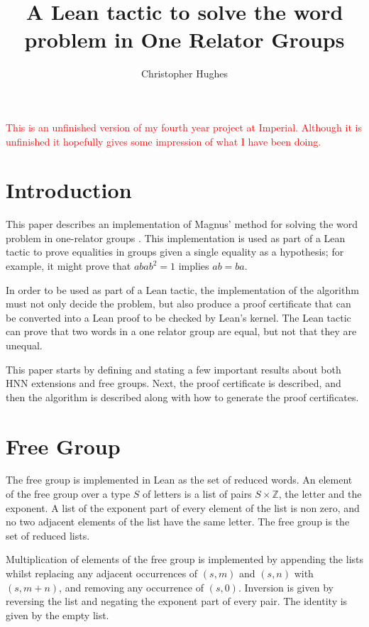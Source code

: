 \documentclass[11pt]{article} %
\title{A Lean tactic to solve the word problem in One Relator Groups}
\author{Christopher Hughes}
\theoremstyle{definition}
\theoremstyle{definition}
\theoremstyle{definition}
\theoremstyle{definition}
\theoremstyle{definition}
\theoremstyle{definition}
\begin{document}
\maketitle

\textcolor{red}{This is an unfinished version of my fourth year project at Imperial.
Although it is unfinished it hopefully gives some impression of what I have been doing.}


\section{Introduction}
This paper describes an implementation of Magnus' method for solving the
word problem in one-relator groups \cite{mccool_schupp_1973}\cite{PutmanOneRelator}.
This implementation is used as part of a Lean tactic to prove equalities in groups given a single equality as a hypothesis; for example, it might prove that $abab^2 = 1$ implies $ab = ba$.

In order to be used as part of a Lean tactic, the implementation of the
algorithm must not only decide the problem, but also produce a proof certificate
that can be converted into a Lean proof to be checked by Lean's kernel. The Lean
tactic can prove that two words in a one relator group are equal, but not that they are unequal.

This paper starts by defining and stating a few important results about both
HNN extensions and free groups. Next, the proof certificate is described, and then
the algorithm is described along with how to generate the proof certificates.

\section{Free Group}

The free group is implemented in Lean as the set of reduced words. An element of
the free group over a type $S$ of letters is a list of pairs $S \times \mathbb{Z}$,
the letter and the exponent.
A list of the exponent part of every element of the list is non zero, and
no two adjacent elements of the list have the same letter. The free group is the set of
reduced lists.

Multiplication of elements of the free group is implemented by appending the lists
whilst replacing any adjacent occurrences of $(s, m)$ and $(s, n)$ with $(s, m + n)$, and removing
any occurrence of $(s, 0)$. Inversion is given by reversing the list and negating
the exponent part of every pair. The identity is given by the empty list.
\end{document}
